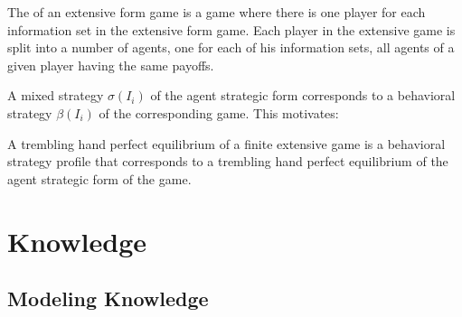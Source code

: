 \documentclass[10pt]{article}
\begin{document}
\begin{definition}
	The  of an extensive form game is a game where there is one player for each information set in the extensive form game. Each player in the extensive game is split into a number of agents, one for each of his information sets, all agents of a given player having the same payoffs.
	
	A mixed strategy $\sigma(I_i)$ of the agent strategic form corresponds to a behavioral strategy $\beta(I_i)$ of the corresponding game. This motivates:
\end{definition}

\begin{definition}
	A trembling hand perfect equilibrium of a finite extensive game is a behavioral strategy profile that corresponds to a trembling hand perfect equilibrium of the agent strategic form of the game.
\end{definition}


\section{Knowledge}

\subsection{Modeling Knowledge}
\end{document}
